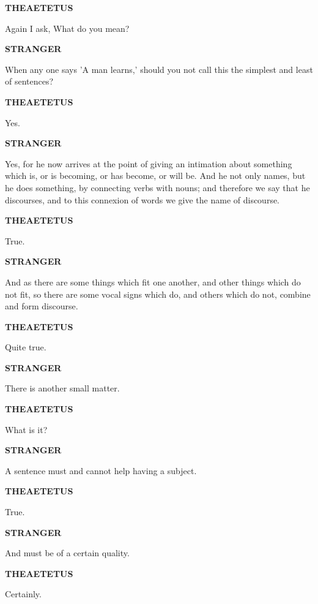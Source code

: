 \documentclass[11pt,letter]{article}
\begin{document}
\par \textbf{THEAETETUS}
\par   Again I ask, What do you mean?

\par \textbf{STRANGER}
\par   When any one says 'A man learns,' should you not call this the simplest and least of sentences?

\par \textbf{THEAETETUS}
\par   Yes.

\par \textbf{STRANGER}
\par   Yes, for he now arrives at the point of giving an intimation about something which is, or is becoming, or has become, or will be. And he not only names, but he does something, by connecting verbs with nouns; and therefore we say that he discourses, and to this connexion of words we give the name of discourse.

\par \textbf{THEAETETUS}
\par   True.

\par \textbf{STRANGER}
\par   And as there are some things which fit one another, and other things which do not fit, so there are some vocal signs which do, and others which do not, combine and form discourse.

\par \textbf{THEAETETUS}
\par   Quite true.

\par \textbf{STRANGER}
\par   There is another small matter.

\par \textbf{THEAETETUS}
\par   What is it?

\par \textbf{STRANGER}
\par   A sentence must and cannot help having a subject.

\par \textbf{THEAETETUS}
\par   True.

\par \textbf{STRANGER}
\par   And must be of a certain quality.

\par \textbf{THEAETETUS}
\par   Certainly.
\end{document}
